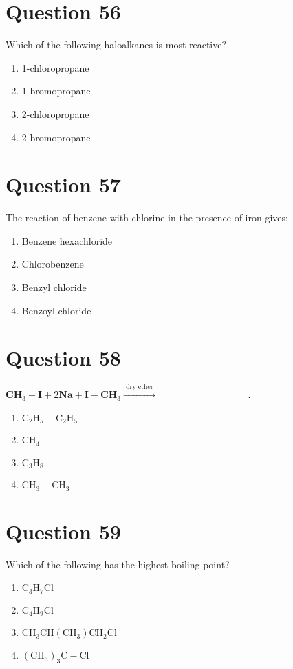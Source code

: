 \documentclass{article}
\begin{document}
\section*{Question 56}
Which of the following haloalkanes is most reactive?\newline
\begin{enumerate}[label=(\alph*)]
\item 1-chloropropane \newline
\item 1-bromopropane
\item 2-chloropropane
\item 2-bromopropane
\end{enumerate}
\newpage
\section*{Question 57}
The reaction of benzene with chlorine in the presence of iron gives:
\begin{enumerate}[label=(\alph*)]
\item Benzene hexachloride
\item Chlorobenzene\newline
\item Benzyl chloride
\item Benzoyl chloride
\end{enumerate}
\newpage
\section*{Question 58}
\(\mathbf{C H}_{3}-\mathbf{I}+2 \mathbf{N} \mathbf{a}+\mathbf{I}-\mathbf{C H}_{3} \stackrel{\text { dry ether }}{\longrightarrow}\) ____________.
\begin{enumerate}[label=(\alph*)]
\item \(\mathrm{C}_{2} \mathrm{H}_{5}-\mathrm{C}_{2} \mathrm{H}_{5}\)
\item \(\mathrm{CH}_{4}\)
\item \(\mathrm{C}_{3} \mathrm{H}_{8}\)
\item \(\mathrm{CH}_{3}-\mathrm{CH}_{3}\)
\end{enumerate}
\newpage
\section*{Question 59}
Which of the following has the highest boiling point?
\begin{enumerate}[label=(\alph*)]
\item \(\mathrm{C}_{3} \mathrm{H}_{7} \mathrm{Cl}\)
\item \(\mathrm{C}_{4} \mathrm{H}_{9} \mathrm{Cl}\)
\item \(\mathrm{CH}_{3} \mathrm{CH}\left(\mathrm{CH}_{3}\right) \mathrm{CH}_{2} \mathrm{Cl}\)
\item \(\left(\mathrm{CH}_{3}\right)_{3} \mathrm{C}-\mathrm{Cl}\)
\end{enumerate}
\newpage
\end{document}
